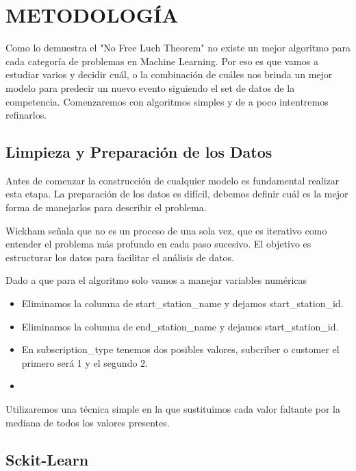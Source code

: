 \section{METODOLOGÍA}

Como lo demuestra el "No Free Luch Theorem" no existe un mejor algoritmo para cada categoría de problemas en Machine Learning.  Por eso es que vamos a estudiar varios y decidir cuál, o la combinación de cuáles nos brinda un mejor modelo para predecir un nuevo evento siguiendo el set de datos de la competencia.
Comenzaremos con algoritmos simples y de a poco intentremos refinarlos.

\subsection{Limpieza y Preparación de los Datos}
Antes de comenzar la construcción de cualquier modelo es fundamental realizar esta etapa. La preparación de los datos es difícil, debemos definir cuál es la mejor forma de manejarlos para describir el problema.

Wickham señala que no es un proceso de una sola vez, que es iterativo como entender el problema más profundo en cada paso sucesivo. El objetivo es estructurar los datos para facilitar el análisis de datos.\cite{RforDataScience}




Dado a que para el algoritmo solo vamos a manejar variables numéricas
\begin{itemize}
   \item Eliminamos la columna de start\_station\_name y dejamos start\_station\_id.
    
    \item Eliminamos la columna de end\_station\_name y dejamos start\_station\_id.
    
    \item En subscription\_type tenemos dos posibles valores, 
    subcriber o customer el primero será 1 y el segundo 2.
    
    \item
    
\end{itemize}

Utilizaremos una técnica simple en la que sustituimos cada valor faltante por la mediana de todos los valores presentes.


\subsection{Sckit-Learn}

